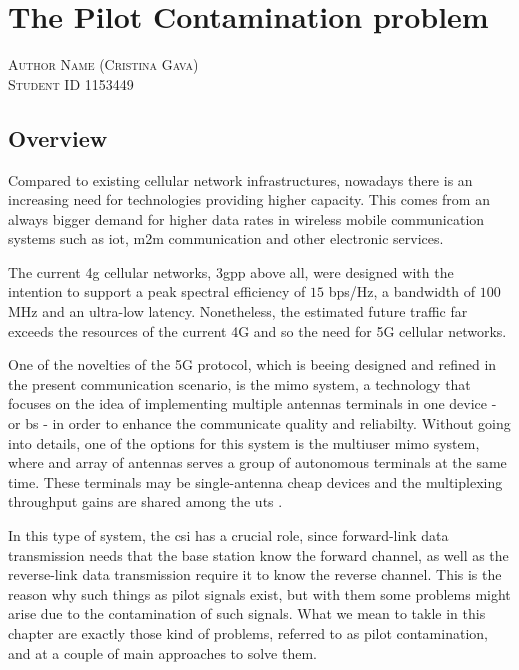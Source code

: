 \documentclass[11pt]{book}
\makeatletter
\newcommand{\chapterauthor}[1]{%
  {\parindent0pt\vspace*{-25pt}%
  \linespread{1.1} \scshape#1%
  \par\nobreak\vspace*{35pt}}
  \@afterheading%
}
\makeatother
\begin{document}

\chapter{The Pilot Contamination problem}
\chapterauthor{Author Name (Cristina Gava)\\
Student ID 1153449}

\section{Overview}
Compared to existing cellular network infrastructures, nowadays there is an increasing need for technologies providing higher capacity. This comes from an always bigger demand for higher data rates in wireless mobile communication systems such as \gls{iot}, \gls{m2m} communication and other electronic services.

The current \gls{4g} cellular networks, \gls{3gpp} above all, were designed with the intention to support a peak spectral efficiency of $15$ bps/Hz, a bandwidth of $100$ MHz and an ultra-low latency. Nonetheless, the estimated future traffic far exceeds the resources of the current 4G and so the need for 5G cellular networks.

One of the novelties of the 5G protocol, which is beeing designed and refined in the present communication scenario, is the \gls{mimo} system, a technology that focuses on the idea of implementing multiple antennas terminals in one device - or \gls{bs} - in order to enhance the communicate quality and reliabilty. Without going into details, one of the options for this system is the multiuser \gls{mimo} system, where and array of antennas serves a group of autonomous terminals at the same time. These terminals may be single-antenna cheap devices and the multiplexing throughput gains are shared among the \gls{ut}s \cite{Marzetta2010} \cite{Elijah2016}.

In this type of system, the \gls{csi} has a crucial role, since forward-link data transmission needs that the base station know the forward channel, as well as the reverse-link data transmission require it to know the reverse channel. This is the reason why such things as pilot signals exist, but with them some problems might arise due to the contamination of such signals. What we mean to takle in this chapter are exactly those kind of problems, referred to as pilot contamination, and at a couple of main approaches to solve them.
\end{document}
